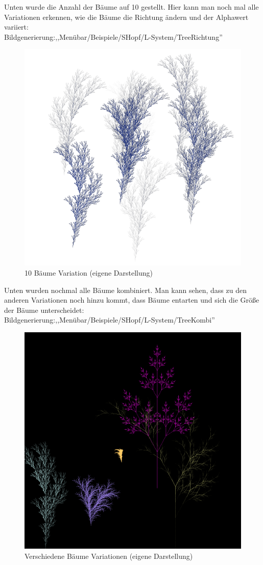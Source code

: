 \documentclass[../mciAusarbeitung.tex]{subfiles}
\begin{document}
		\noindent Unten wurde die Anzahl der Bäume auf 10 gestellt. Hier kann man noch mal alle Variationen erkennen, wie die Bäume die Richtung ändern und der Alphawert variiert:\\
		Bildgenerierung:,,Menübar/Beispiele/SHopf/L-System/TreeRichtung''\\
		\begin{figure}[H]
			\centering
			\includegraphics[width=0.5\linewidth]{img/tree10Richtung.png}
			\caption[TreeRichtung]{10 Bäume Variation (eigene Darstellung)}
		\end{figure}
		\noindent Unten wurden nochmal alle Bäume kombiniert. Man kann sehen, dass zu den anderen Variationen noch hinzu kommt, dass Bäume entarten und sich die Größe der Bäume unterscheidet:\\
		Bildgenerierung:,,Menübar/Beispiele/SHopf/L-System/TreeKombi''\\
		\begin{figure}[H]
			\centering
			\includegraphics[width=\linewidth]{img/treeKombi.png}
			\caption[TreeKombi]{Verschiedene Bäume Variationen (eigene Darstellung)}
		\end{figure}
		
\end{document}

